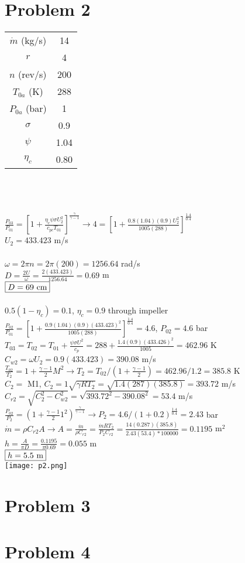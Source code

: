 \documentclass{article}
\begin{document}
\section*{Problem 2}
\begin{tabular}{cc}
    $\dot{m}$ (kg/s) & 14 \\
    $r$ & 4 \\
    $n$ (rev/s) & 200 \\
    $T_{0a}$ (K) & 288 \\
    $P_{0a}$ (bar) & 1 \\
    $\sigma$ & 0.9 \\
    $\psi$ & 1.04 \\
    $\eta_c$ & 0.80
\end{tabular} \\\\\\
$\frac{P_{03}}{P_{01}}=[1 + \frac{\eta_c \psi \sigma U_2^2}{c_{pc} T_{01}}]^
\frac{\gamma}{\gamma-1} \rightarrow
4 = [1 + \frac{0.8(1.04)(0.9)U_2^2}{1005(288)}]^\frac{1.4}{0.4}$ \\
$U_2=433.423$ m/s \\\\
$\omega=2\pi n=2\pi(200)=1256.64$ rad/s \\
$D=\frac{2U}{\omega}=\frac{2(433.423)}{1256.64}=0.69$ m \\
$\fbox{$D=69$ cm}$ \\\\
$0.5(1-\eta_c)=0.1$, \quad $\eta_c=0.9$ through impeller \\
$\frac{P_{02}}{P_{01}}=[1+\frac{0.9(1.04)(0.9)(433.423)^2}{1005(288)}]^\frac{1.4}{0.4}
=4.6$, \quad $P_{02}=4.6$ bar \\
$T_{03}=T_{02}=T_{01}+\frac{\psi \sigma U^2}{c_p}=288+\frac{1.4(0.9)(433.426)^2}{1005}
=462.96$ K \\
$C_{w2}=\omega U_2=0.9(433.423)=390.08$ m/s \\
$\frac{T_{02}}{T_2}=1+\frac{\gamma-1}{2}M^2 \rightarrow
T_2=T_{02}/(1+\frac{\gamma-1}{2})=462.96/1.2=385.8$ K \\
$C_2=$ M1, \quad $C_2=1\sqrt{\gamma R T_2}=\sqrt{1.4(287)(385.8)}=393.72$ m/s \\
$C_{r2}=\sqrt{C_2^2 - C_{w2}^2}=\sqrt{393.72^2 - 390.08^2}=53.4$ m/s \\
$\frac{P_{02}}{P_2}=(1+\frac{\gamma-1}{2}1^2)^\frac{\gamma}{\gamma-1} \rightarrow
P_2=4.6/(1+0.2)^\frac{1.4}{0.4}=2.43$ bar \\
$\dot{m}=\rho C_{r2} A \rightarrow A=\frac{\dot{m}}{\rho C_{r2}}=
\frac{\dot{m}RT_2}{P_2 C_{r2}}=\frac{14(0.287)(385.8)}{2.43(53.4)*100000}=0.1195$ m$^2$ \\
$h=\frac{A}{\pi D}=\frac{0.1195}{\pi 0.69}=0.055$ m \\
$\fbox{$h=5.5$ m}$ \\
\texttt{[image: p2.png]}

\section*{Problem 3}

\section*{Problem 4}
\end{document}
